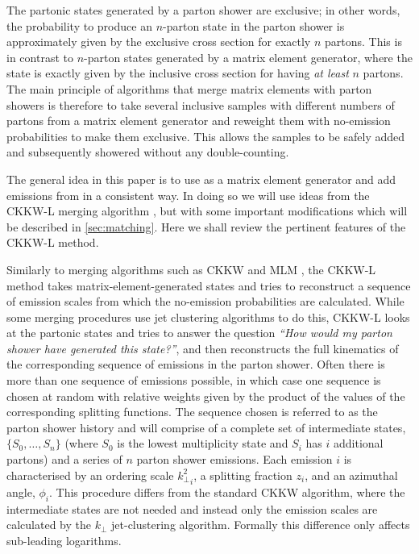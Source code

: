 The partonic states generated by a parton shower are exclusive;
in other words, the probability to produce an $n$-parton state in the parton shower is approximately given by the exclusive
cross section for exactly $n$ partons.
This is in contrast to
$n$-parton states generated by a matrix element generator,
where the state is exactly given by the inclusive cross
section for having \emph{at least} $n$ partons. The main principle
of algorithms that merge matrix elements with parton showers is
therefore to take several inclusive samples with different numbers of
partons from a matrix element generator and reweight them with
no-emission probabilities to make them exclusive. 
This allows the
samples to be safely added and subsequently showered 
without any double-counting.

The general idea in this paper is to use \HEJ as a matrix element
generator and add emissions from \py in a consistent way. In doing so
we will use ideas from the CKKW-L merging algorithm
\cite{Lonnblad:2001iq,Lavesson:2005xu,Lonnblad:2011xx}, but with some
important modifications which will be described in \cref{sec:matching}.
Here we shall review the pertinent features of the CKKW-L method. 

Similarly to
merging algorithms such as CKKW \cite{Catani:2001cc} and
MLM \cite{Mangano:2006rw}, the CKKW-L method takes matrix-element-generated states
and tries to reconstruct a sequence of emission scales from which the
no-emission probabilities are calculated. While some merging procedures use
jet clustering algorithms to do this, CKKW-L looks at the partonic states and
tries to answer the question \textit{``How would my parton shower have
  generated this state?''}, and then reconstructs the full kinematics of
the corresponding sequence of emissions in the parton shower. Often
there is more than one sequence of emissions possible, in which case
one sequence is chosen at random with relative weights given by 
the product of the values of the corresponding splitting
functions. The sequence chosen is referred to as the parton shower history
and will comprise of a complete set of intermediate states,
$\{S_0,\ldots,S_n\}$ (where $S_0$ is the lowest multiplicity state and
$S_i$ has $i$ additional partons) and a series of $n$ parton shower
emissions. Each emission $i$ is characterised by an ordering scale
${k^2_\perp}_i$, a splitting fraction $z_i$, and an azimuthal angle,
$\phi_i$. This procedure differs from the standard
  CKKW algorithm, where the intermediate states are not needed and
  instead only the emission scales are calculated by the
  $k_\perp$ jet-clustering algorithm. Formally this difference only affects
  sub-leading logarithms.

